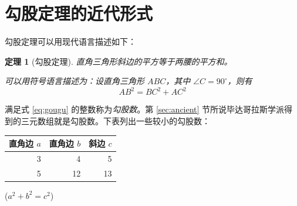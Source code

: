 \documentclass[UTF8]{ctexart}
\newtheorem{thm}{定理}
\newcommand\degree{^\circ}
\begin{document}
\section{勾股定理的近代形式}

勾股定理可以用现代语言描述如下：

\begin{thm}[勾股定理]
直角三角形斜边的平方等于两腰的平方和。

可以用符号语言描述为：设直角三角形 $ABC$，其中 $\angle C=90\degree$，则有
\begin{equation}\label{eq:gougu}
AB^2=BC^2+AC^2
\end{equation}
\end{thm}

满足式 \eqref{eq:gougu} 的整数称为\emph{勾股数}。第 \ref{sec:ancient} 节所说毕达哥拉斯学派得到的三元数组就是勾股数。下表列出一些较小的勾股数：
\begin{table}[H]
\centering
\begin{tabular}{|rrr|}
\hline
直角边 $a$ & 直角边 $b$ & 斜边 $c$\\
\hline
3 & 4 & 5 \\
5 &12 & 13 \\
\hline
\end{tabular}%
\qquad
($a^2 + b^2 = c^2$)
\end{table}

\nocite{Shiye}

\end{document}
